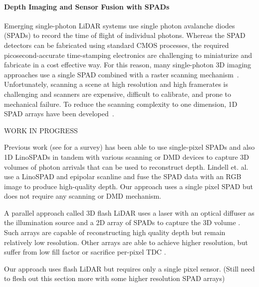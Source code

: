 \paragraph{Depth Imaging and Sensor Fusion with SPADs}
%
Emerging single-photon LiDAR systems use single photon avalanche diodes (SPADs) to record the time of flight of individual photons. Whereas the SPAD detectors can be fabricated using standard CMOS processes, the required picosecond-accurate time-stamping electronics are challenging to miniaturize and fabricate in a cost effective way. For this reason, many single-photon 3D imaging approaches use a single SPAD combined with a raster scanning mechanism~\cite{Lamb2010,Kirmani:2014,pawlikowska2017single,Li:2019}. Unfortunately, scanning a scene at high resolution and high framerates is challenging and scanners are expensive, difficult to calibrate, and prone to mechanical failure. To reduce the scanning complexity to one dimension, 1D SPAD arrays have been developed~\cite{burri2016linospad,burri2017linospad,OToole2017}.

WORK IN PROGRESS
 
Previous work (see \cite{Horaud2016} for a survey) has been able to use
single-pixel SPADs \cite{Lamb2010} and also 1D LinoSPADs in
tandem with various scanning or DMD devices to capture 3D volumes of photon arrivals
that can be used to reconstruct depth. Lindell et. al. \cite{Lindell2018} use a
LinoSPAD and epipolar scanline and fuse the SPAD data with an RGB image to
produce high-quality depth.  Our approach uses a single pixel SPAD but
does not require any scanning or DMD mechanism.

A parallel approach called 3D flash LiDAR uses a laser with an optical diffuser
as the illumination source and a 2D array of SPADs to capture the 3D volume
\cite{Stoppa2007, Niclass2005}. Such arrays are capable of reconstructing high
quality depth but remain relatively low resolution. Other arrays are able to
achieve higher resolution, but suffer from low fill factor \cite{Veerappan2011} or
sacrifice per-pixel TDC \cite{Zhang2018}.

Our approach uses flash LiDAR but requires only a single pixel 
sensor.
(Still need to flesh out this section more with some higher resolution SPAD arrays)

